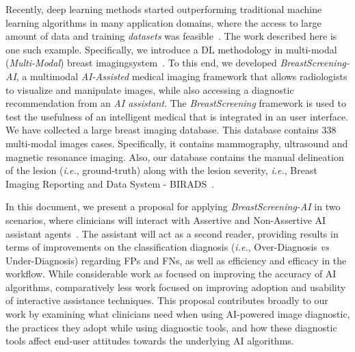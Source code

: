 Recently, deep learning methods started outperforming traditional machine learning algorithms in many application domains, where the access to large amount of data and training {\it datasets} was feasible~\cite{calisto2017mimbcdui}.
The work described here is one such example.
Specifically, we introduce a  DL methodology in multi-modal ({\it Multi-Modal}) breast imaging\footnotemark[1] system~\cite{https://doi.org/10.13140/rg.2.2.29816.70409}.
To this end, we developed {\it BreastScreening-AI}, a multimodal {\it AI-Assisted} medical imaging framework that allows radiologists to visualize and manipulate images, while also accessing a diagnostic recommendation from an {\it AI assistant}.
The {\it BreastScreening} framework is used to test the usefulness of an intelligent medical that is integrated in an user interface. 
We have collected a large breast imaging database. This database contains 338 multi-modal images cases. Specifically, it contains mammography, ultrasound and magnetic resonance imaging.
Also, our database contains the manual delineation of the lesion ({\it i.e.}, ground-truth) along with the lesion severity, {\it i.e.}, Breast Imaging Reporting and Data System - BIRADS~\cite{ghosh2019artificial}.


In this document, we present a proposal for applying {\it BreastScreening-AI} in two scenarios, where clinicians will interact with Assertive and Non-Assertive AI assistant agents~\cite{pacheco2019alignment, 10.1145/3311350.3347162}.
The assistant will act as a second reader, providing results in terms of improvements on the classification diagnosis ({\it i.e.}, Over-Diagnosis {\it vs} Under-Diagnosis) regarding FPs and FNs, as well as efficiency and efficacy in the workflow.
While considerable work as focused on improving the accuracy of AI algorithms, comparatively less work focused on improving adoption and usability of interactive assistance techniques.
This proposal contributes broadly to our work by examining what clinicians need when using AI-powered image diagnostic, the practices they adopt while using diagnostic tools, and how these diagnostic tools affect end-user attitudes towards the underlying AI algorithms.